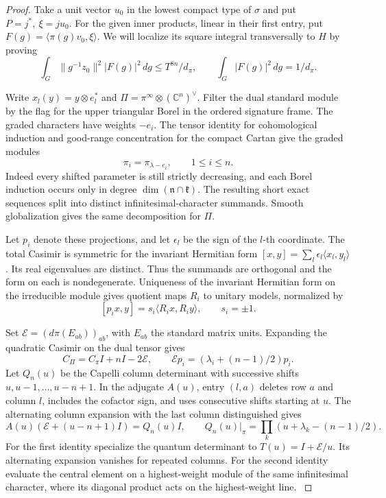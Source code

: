 \begin{proof}
Take a unit vector \(u_0\) in the lowest compact type of \(\sigma\)
and put \(P=j^*,\ \xi=ju_0\). For the given inner products, linear in
their first entry, put \(F(g)=\langle\pi(g)v_0,\xi\rangle\).
We will localize its square integral transversally to \(H\) by proving
\begin{equation}\label{eq:weighted-fitted-moment}
 \int_G\|g^{-1}z_0\|^2|F(g)|^2\,dg
       \le T^{8n}/d_\pi,\qquad
 \int_G|F(g)|^2\,dg=1/d_\pi .
\end{equation}

Write \(x_l(y)=y\otimes e_l^*\) and
\(\Pi=\pi^\infty\otimes(\mathbb C^n)^\vee\).
Filter the dual standard module by the flag for the upper triangular
Borel in the ordered signature frame. The graded characters have
weights \(-e_i\). The tensor identity for cohomological induction
and good-range concentration for the compact Cartan give the graded
modules
\[
       \pi_i=\pi_{\lambda-e_i},\qquad 1\le i\le n .
\]
Indeed every shifted parameter is still strictly decreasing, and
each Borel induction occurs only in degree
\(\dim(\mathfrak n\cap\mathfrak k)\). The resulting short exact
sequences split into distinct infinitesimal-character summands.
Smooth globalization gives the same decomposition for \(\Pi\).
\cite[Proposition~3.6 and (14)]{prudhon-translation}
\cite[Theorems~5.35, 5.99, 8.2 and Chapter~XI]{knapp-vogan-cohomological}
\cite[Theorems~1.1 and 10.6]{casselman-wallach}

Let \(p_i\) denote these projections, and let \(\epsilon_l\) be the sign
of the \(l\)-th coordinate. The total Casimir is symmetric for the
invariant Hermitian form \([x,y]=\sum_l\epsilon_l\langle x_l,y_l\rangle\).
Its real eigenvalues are distinct. Thus the summands are orthogonal
and the form on each is nondegenerate. Uniqueness of the invariant
Hermitian form on the irreducible module gives quotient maps \(R_i\)
to unitary models, normalized by
\[
         [p_i x,y]=s_i\langle R_i x,R_i y\rangle,\qquad s_i=\pm1 .
\]

Set \(\mathcal E=(d\pi(E_{ab}))_{ab}\), with \(E_{ab}\) the standard
matrix units. Expanding the quadratic Casimir on the dual tensor gives
\[
 C_\Pi=C_\pi I+nI-2\mathcal E,\qquad
 \mathcal E p_i=(\lambda_i+(n-1)/2)p_i .
\]
Let \(Q_n(u)\) be the Capelli column determinant with successive
shifts \(u,u-1,\ldots,u-n+1\). In the adjugate \(A(u)\), entry
\((l,a)\) deletes row \(a\) and column \(l\), includes the cofactor
sign, and uses consecutive shifts starting at \(u\). The alternating
column expansion with the last column distinguished gives
\[
 A(u)(\mathcal E+(u-n+1)I)=Q_n(u)I,\qquad
 Q_n(u)|_\pi=\prod_k(u+\lambda_k-(n-1)/2).
\]
For the first identity specialize the quantum determinant to
\(T(u)=I+\mathcal E/u\). Its alternating expansion vanishes for
repeated columns. For the second identity evaluate the central
element on a highest-weight module of the same infinitesimal
character, where its diagonal product acts on the highest-weight
line. \cite[Proposition~2.7(4) and Remarks~2.8(1), 2.11]{mno-yangians}


\end{proof}
